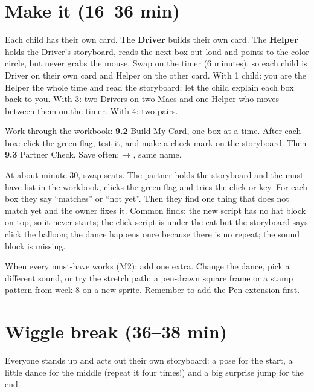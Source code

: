 \section{Make it (16--36 min)}
\begin{pairroles}
Each child has their own card. The \textbf{Driver} builds their own card. The \textbf{Helper} holds the Driver's storyboard, reads the next box out loud and points to the color circle, but never grabs the mouse. Swap on the timer (6 minutes), so each child is Driver on their own card and Helper on the other card. With 1 child: you are the Helper the whole time and read the storyboard; let the child explain each box back to you. With 3: two Drivers on two Macs and one Helper who moves between them on the timer. With 4: two pairs.
\end{pairroles}

Work through the workbook: \textbf{9.2} Build My Card, one box at a time. After each box: click the green flag, test it, and make a check mark on the storyboard. Then \textbf{9.3} Partner Check. Save often:  → , same name.

\begin{bughunt}
At about minute 30, swap seats. The partner holds the storyboard and the must-have list in the workbook, clicks the green flag and tries the click or key. For each box they say \enquote{matches} or \enquote{not yet}. Then they find one thing that does not match yet and the owner fixes it. Common finds: the new script has no hat block on top, so it never starts; the click script is under the cat but the storyboard says click the balloon; the dance happens once because there is no repeat; the sound block is missing.
\end{bughunt}

\begin{freebuild}
When every must-have works (M2): add one extra. Change the dance, pick a different sound, or try the stretch path: a pen-drawn square frame or a stamp pattern from week 8 on a new sprite. Remember to add the Pen extension first.
\end{freebuild}

\section{Wiggle break (36--38 min)}
Everyone stands up and acts out their own storyboard: a pose for the start, a little dance for the middle (repeat it four times!) and a big surprise jump for the end.

